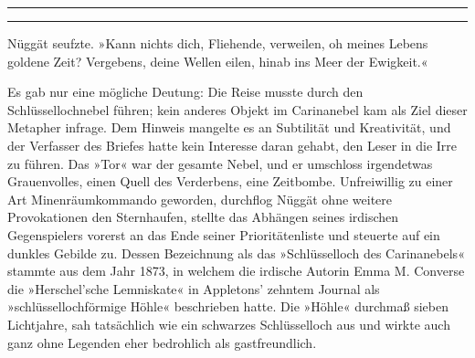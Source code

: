 \noindent \parbox{\textwidth}{ \vspace{3ex} \hrule \vspace{3ex}





\vspace{3ex} \hrule \vspace{3ex} }

Nüggät seufzte. »Kann nichts dich, Fliehende, verweilen, oh meines Lebens goldene Zeit? Vergebens, deine Wellen eilen, hinab ins Meer der Ewigkeit.«

Es gab nur eine mögliche Deutung: Die Reise musste durch den Schlüssellochnebel führen; kein anderes Objekt im Carinanebel kam als Ziel dieser Metapher infrage. Dem Hinweis mangelte es an Subtilität und Kreativität, und der Verfasser des Briefes hatte kein Interesse daran gehabt, den Leser in die Irre zu führen. Das »Tor« war der gesamte Nebel, und er umschloss irgendetwas Grauenvolles, einen Quell des Verderbens, eine Zeitbombe. Unfreiwillig zu einer Art Minenräumkommando geworden, durchflog Nüggät ohne weitere Provokationen den Sternhaufen, stellte das Abhängen seines irdischen Gegenspielers vorerst an das Ende seiner Prioritätenliste und steuerte auf ein dunkles Gebilde zu. Dessen Bezeichnung als das »Schlüsselloch des Carinanebels« stammte aus dem Jahr 1873, in welchem die irdische Autorin Emma M. Converse die »Herschel'sche Lemniskate« in Appletons’ zehntem Journal als »schlüssellochförmige Höhle« beschrieben hatte. Die »Höhle« durchmaß sieben Lichtjahre, sah tatsächlich wie ein schwarzes Schlüsselloch aus und wirkte auch ganz ohne Legenden eher bedrohlich als gastfreundlich.

